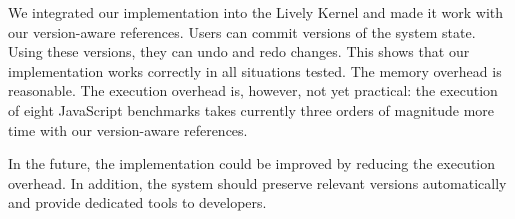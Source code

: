 We integrated our implementation into the Lively Kernel and made it work with our version-aware references.
Users can commit versions of the system state.
Using these versions, they can undo and redo changes.
This shows that our implementation works correctly in all situations tested.
The memory overhead is reasonable.
The execution overhead is, however, not yet practical: the execution of eight JavaScript benchmarks takes currently three orders of magnitude more time with our version-aware references.

In the future, the implementation could be improved by reducing the execution overhead.
In addition, the system should preserve relevant versions automatically and provide dedicated tools to developers.

